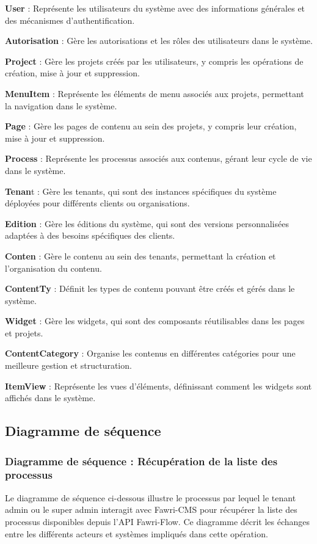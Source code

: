 \textbf{User} : Représente les utilisateurs du système avec des informations générales et des mécanismes d'authentification.

\textbf{Autorisation} : Gère les autorisations et les rôles des utilisateurs dans le système.

\textbf{Project} : Gère les projets créés par les utilisateurs, y compris les opérations de création, mise à jour et suppression.

\textbf{MenuItem} : Représente les éléments de menu associés aux projets, permettant la navigation dans le système.

\textbf{Page} : Gère les pages de contenu au sein des projets, y compris leur création, mise à jour et suppression.

\textbf{Process} : Représente les processus associés aux contenus, gérant leur cycle de vie dans le système.

\textbf{Tenan}t : Gère les tenants, qui sont des instances spécifiques du système déployées pour différents clients ou organisations.

\textbf{Edition} : Gère les éditions du système, qui sont des versions personnalisées adaptées à des besoins spécifiques des clients.

\textbf{Conten} : Gère le contenu au sein des tenants, permettant la création et l'organisation du contenu.

\textbf{ContentTy} : Définit les types de contenu pouvant être créés et gérés dans le système.

\textbf{Widget} : Gère les widgets, qui sont des composants réutilisables dans les pages et projets.

\textbf{ContentCategory} : Organise les contenus en différentes catégories pour une meilleure gestion et structuration.

\textbf{ItemView} : Représente les vues d'éléments, définissant comment les widgets sont affichés dans le système.



\subsection{Diagramme de séquence}


\subsubsection{Diagramme de séquence : Récupération de la liste des processus}

\hspace{\parindent}Le diagramme de séquence ci-dessous illustre le processus par lequel le tenant admin ou le super admin interagit avec Fawri-CMS pour récupérer la liste des processus disponibles depuis l'API Fawri-Flow. Ce diagramme décrit les échanges entre les différents acteurs et systèmes impliqués dans cette opération.
\\

